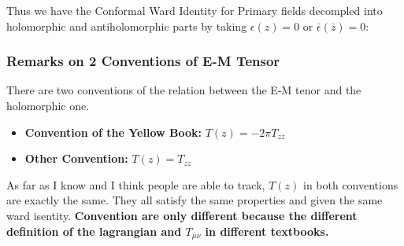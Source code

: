 Thus we have the Conformal Ward Identity for Primary fields decompled into holomorphic and antiholomorphic parts by taking $ \epsilon(z) = 0 $ or $ \bar{\epsilon}(\bar{z}) = 0 $:

\subsubsection{Remarks on 2 Conventions of E-M Tensor}

There are two conventions of the relation between the E-M tenor and the holomorphic one. 
\begin{itemize}
  \item \textbf{Convention of the Yellow Book: } $ T(z) = -2 \pi T_{zz} $
  \item \textbf{Other Convention: } $ T(z) =  T_{zz} $
\end{itemize}
As far as I know and I think people are able to track, $ T(z) $ in both conventions are exactly the same. They all satisfy the same properties and given the same ward isentity. \textbf{Convention are only different because the different definition of the lagrangian and $ T_{\mu\nu} $ in different textbooks.}

